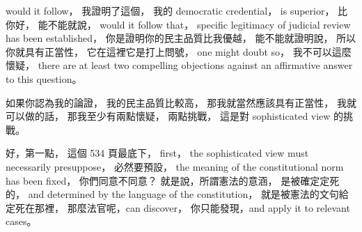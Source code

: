 \hypertarget{w02:cue:2174}{}would it follow，
\hypertarget{w02:cue:2175}{}我證明了這個，
\hypertarget{w02:cue:2176}{}我的 democratic credential，
\hypertarget{w02:cue:2177}{}is superior，
\hypertarget{w02:cue:2178}{}比你好，
\hypertarget{w02:cue:2179}{}能不能就說，
\hypertarget{w02:cue:2180}{}would it follow that，
\hypertarget{w02:cue:2181}{}specific legitimacy of judicial review has been established，
\hypertarget{w02:cue:2182}{}你是證明你的民主品質比我優越，
\hypertarget{w02:cue:2183}{}能不能就證明說，
\hypertarget{w02:cue:2184}{}所以你就具有正當性，
\hypertarget{w02:cue:2185}{}它在這裡它是打上問號，
\hypertarget{w02:cue:2186}{}one might doubt so，
\hypertarget{w02:cue:2187}{}我不可以這麼懷疑，
\hypertarget{w02:cue:2188}{}there are at least two compelling objections against an affirmative answer to this question。

\hypertarget{w02:cue:2189}{}如果你認為我的論證，
\hypertarget{w02:cue:2190}{}我的民主品質比較高，
\hypertarget{w02:cue:2191}{}那我就當然應該具有正當性，
\hypertarget{w02:cue:2192}{}我就可以做的話，
\hypertarget{w02:cue:2193}{}那我至少有兩點懷疑，
\hypertarget{w02:cue:2194}{}兩點挑戰，
\hypertarget{w02:cue:2195}{}這是對 sophisticated view 的挑戰。

\hypertarget{w02:cue:2196}{}好，第一點，
\hypertarget{w02:cue:2197}{}這個 534 頁最底下，
\hypertarget{w02:cue:2198}{}first，
\hypertarget{w02:cue:2199}{}the sophisticated view must necessarily presuppose，
\hypertarget{w02:cue:2200}{}必然要預設，
\hypertarget{w02:cue:2201}{}the meaning of the constitutional norm has been fixed，
\hypertarget{w02:cue:2202}{}你們同意不同意？
\hypertarget{w02:cue:2203}{}就是說，所謂憲法的意涵，
\hypertarget{w02:cue:2204}{}是被確定定死的，
\hypertarget{w02:cue:2205}{}and determined by the language of the constitution，
\hypertarget{w02:cue:2206}{}就是被憲法的文句給定死在那裡，
\hypertarget{w02:cue:2207}{}那麼法官呢，can discover，
\hypertarget{w02:cue:2208}{}你只能發現，and apply it to relevant cases。

